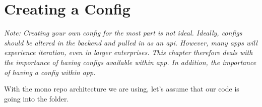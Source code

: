 \maketitle{}
\section{ Creating a Config }

\textit{ Note: Creating your own config for the most part is not ideal. Ideally,
configs should be altered in the backend and pulled in as an api. However, many
apps will experience iteration, even in larger enterprises. This chapter
therefore deals with the importance of having configs available within app. In
addition, the importance of having a config within app.}

With the mono repo architecture we are using, let's assume that our code is
going into the \appNameKebabCase{} folder.
